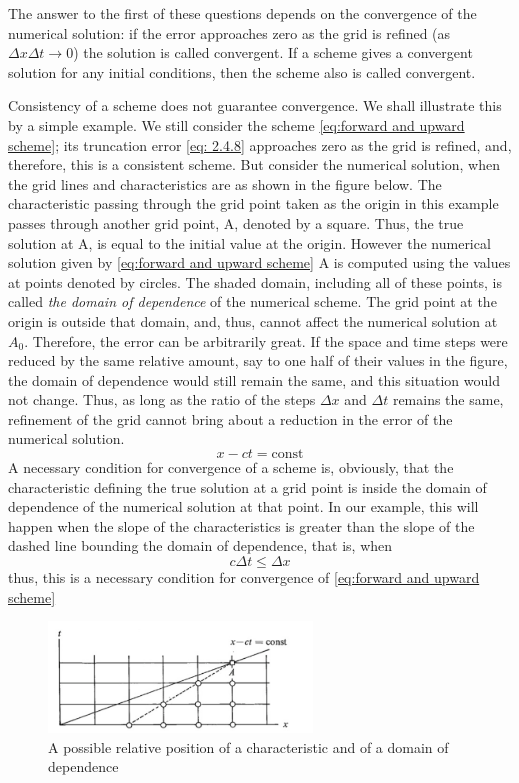  The answer to the first of these questions depends on the convergence of the numerical solution: if the error approaches zero as the grid is refined (as $\Delta x\Delta t\rightarrow 0$) the solution is called convergent. If a scheme gives a convergent solution for any initial conditions, then the scheme also is called convergent.

Consistency of a scheme does not guarantee convergence. We shall illustrate this by a simple example. We still consider the scheme \ref{eq:forward and upward scheme}; its truncation error \ref{eq: 2.4.8} approaches zero as the grid is refined, and, therefore, this is a consistent scheme. But consider the numerical solution, when the grid lines and characteristics are as shown in the figure below. The characteristic passing through the grid point taken as the origin in this example passes through another grid point, A, denoted by a square. Thus, the true solution at A, is equal to the initial value at the origin. However the numerical solution given by \ref{eq:forward and upward scheme} A is computed using the values at points denoted by circles. The shaded domain, including all of these points, is called \textit{the domain of dependence} of the numerical scheme. The grid point at the origin is outside that domain, and, thus, cannot affect the numerical solution at $A_0$. Therefore, the error can be arbitrarily great. If the space and time steps were reduced by the same relative amount, say to one half of their values in the figure, the domain of dependence would still remain the same, and this situation would not change. Thus, as long as the ratio of the steps $\Delta x$ and $\Delta t$ remains the same, refinement of the grid cannot bring about a reduction in the error of the numerical solution.
$$x-ct=\text{const}$$
A necessary condition for convergence of a scheme is, obviously, that the characteristic defining the true solution at a grid point is inside the domain of dependence of the numerical solution at that point. In our example, this will happen when the slope of the characteristics is greater than the slope of the dashed line bounding the domain of dependence, that is, when $$c\Delta t\leq \Delta x$$
thus, this is a necessary condition for convergence of \ref{eq:forward and upward scheme} 
\begin{figure}[h]
    \centering
    \includegraphics[width=7cm]{uploads/Screenshot 2024-11-10 192132.png}
    \caption{A possible relative position of a characteristic and of a domain of dependence}
    \label{fig:grid sol}
\end{figure}
